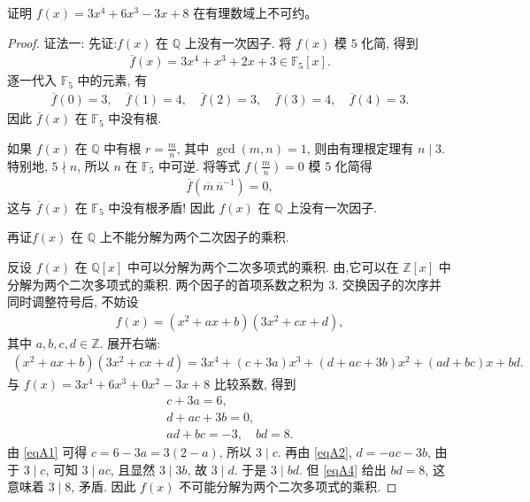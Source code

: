 \documentclass[../../main.tex]{subfiles}%
\begin{document}
\begin{example}
证明 \( f(x) = 3x^{4} + 6x^{3} - 3x + 8 \) 在有理数域上不可约。
\end{example}
\begin{proof}

{\color{blue}证法一:}
先证:\( f(x) \) 在 \( \mathbb{Q} \) 上没有一次因子.
将 \( f(x) \) 模 \(5\) 化简, 得到
\begin{align*}
\overline{f}(x) = 3x^{4} + x^{3} + 2x + 3 \in \mathbb{F}_{5}[x].
\end{align*}
逐一代入 \( \mathbb{F}_{5} \) 中的元素, 有
\begin{align*}
\overline{f}(0)=3,\quad \overline{f}(1)=4,\quad \overline{f}(2)=3,\quad \overline{f}(3)=4,\quad \overline{f}(4)=3.
\end{align*}
因此 \( \overline{f}(x) \) 在 \( \mathbb{F}_{5} \) 中没有根.

如果 \( f(x) \) 在 \( \mathbb{Q} \) 中有根 \( r = \frac{m}{n} \), 其中 \( \gcd(m,n)=1 \), 则由有理根定理有 \( n \mid 3 \). 特别地, \( 5 \nmid n \), 所以 \( n \) 在 \( \mathbb{F}_{5} \) 中可逆. 将等式 \( f(\frac{m}{n})=0 \) 模 \(5\) 化简得
\begin{align*}
\overline{f}(\overline{m}\,\overline{n}^{-1}) = 0,
\end{align*}
这与 \( \overline{f}(x) \) 在 \( \mathbb{F}_{5} \) 中没有根矛盾! 因此 \( f(x) \) 在 \( \mathbb{Q} \) 上没有一次因子.

再证\( f(x) \) 在 \( \mathbb{Q} \) 上不能分解为两个二次因子的乘积.

反设 \( f(x) \) 在 \( \mathbb{Q}[x] \) 中可以分解为两个二次多项式的乘积. 由,它可以在 \( \mathbb{Z}[x] \) 中分解为两个二次多项式的乘积. 两个因子的首项系数之积为 \(3\). 交换因子的次序并同时调整符号后, 不妨设
\begin{align*}
f(x) = (x^{2} + ax + b)(3x^{2} + cx + d),
\end{align*}
其中 \( a,b,c,d \in \mathbb{Z} \). 展开右端:
\begin{align*}
(x^{2} + ax + b)(3x^{2} + cx + d) = 3x^{4} + (c + 3a)x^{3} + (d + ac + 3b)x^{2} + (ad + bc)x + bd.
\end{align*}
与 \( f(x) = 3x^{4} + 6x^{3} + 0x^{2} - 3x + 8 \) 比较系数, 得到
\begin{gather}
c + 3a = 6, \label{eqA1} \\
d + ac + 3b = 0, \label{eqA2} \\
ad + bc = -3,  \quad
bd = 8. \label{eqA4}
\end{gather}
由 \eqref{eqA1} 可得 \( c = 6 - 3a = 3(2-a) \), 所以 \( 3 \mid c \). 再由 \eqref{eqA2}, \( d = -ac - 3b \), 由于 \( 3 \mid c \), 可知 \( 3 \mid ac \), 且显然 \( 3 \mid 3b \), 故 \( 3 \mid d \). 于是 \( 3 \mid bd \). 但 \eqref{eqA4} 给出 \( bd = 8 \), 这意味着 \( 3 \mid 8 \), 矛盾. 因此 \( f(x) \) 不可能分解为两个二次多项式的乘积.


\end{proof}
\end{document}

